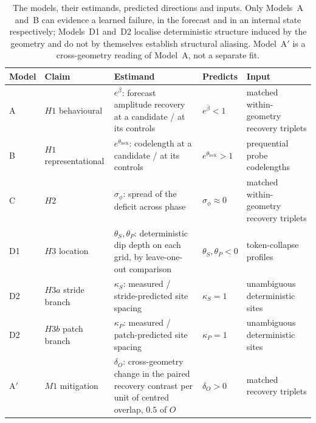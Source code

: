 \begin{table}[!b]
    \centering
\small
    \setlength{\tabcolsep}{4pt}
    \begin{tabular}{@{}llM{6.3cm}lM{3.3cm}@{}}
        \toprule
        \textbf{Model} & \textbf{Claim} & \textbf{Estimand} & \textbf{Predicts} & \textbf{Input} \\
        \midrule
        A  & $H1$ behavioural      & $e^{\bar\beta}$: forecast amplitude recovery at a candidate / at its controls & $e^{\bar\beta}<1$ & matched within-geometry recovery triplets \\
        \rowsep%
        B  & $H1$ representational & $e^{\theta_{\mathrm{lock}}}$: codelength at a candidate / at its controls & $e^{\theta_{\mathrm{lock}}}>1$ & prequential probe codelengths \\
        \rowsep%
        C  & $H2$                  & $\sigma_\phi$: spread of the deficit across phase & $\sigma_\phi\approx 0$ & matched within-geometry recovery triplets \\
        \rowsep%
        D1 & $H3$ location         & $\theta_S,\theta_P$: deterministic dip depth on each grid, by leave-one-out comparison & $\theta_S,\theta_P<0$ & token-collapse profiles \\
        \rowsep%
        D2 & $H3a$ stride branch   & $\kappa_S$: measured / stride-predicted site spacing & $\kappa_S=1$ & unambiguous deterministic sites \\
        \rowsep%
        D2 & $H3b$ patch branch    & $\kappa_P$: measured / patch-predicted site spacing & $\kappa_P=1$ & unambiguous deterministic sites \\
        \rowsep%
        A$'$ & $M1$ mitigation     & $\delta_O$: cross-geometry change in the paired recovery contrast per unit of centred overlap, $0.5$ of $O$ & $\delta_O>0$ & matched recovery triplets \\
        \bottomrule
    \end{tabular}
\caption{The models, their estimands, predicted directions and inputs. Only Models~A and~B can evidence a learned failure, in the forecast and in an internal state respectively; Models~D1 and~D2 localise deterministic structure induced by the geometry and do not by themselves establish structural aliasing. Model~A$'$ is a cross-geometry reading of Model~A, not a separate fit.}%
    \label{tab:bayesModels}
\end{table}
